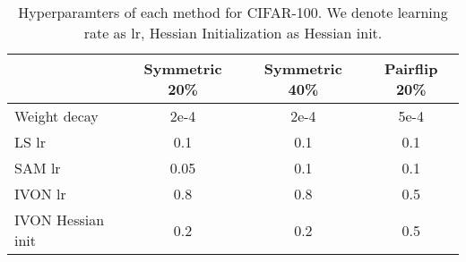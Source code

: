 \begin{table}[ht]
\centering
\caption{Hyperparamters of each method for CIFAR-100. We denote learning rate as lr, Hessian Initialization as Hessian init.}
\label{tab: cifar100 hyperparameter tuning results}
\begin{tabular}{lccc}
\toprule
                   & Symmetric 20\% & Symmetric 40\% & Pairflip 20\% \\
                   \midrule
Weight decay       & 2e-4           & 2e-4           & 5e-4          \\
LS \citep{Szegedy_rethinking} lr & 0.1               &     0.1           &    0.1           \\
SAM \citep{SAM_org} lr             &     0.05           &    0.1            &    0.1           \\
IVON \citep{IVON} lr            &      0.8          &     0.8           &      0.5         \\
IVON \citep{IVON} Hessian init  &      0.2          &     0.2           &      0.5         \\\bottomrule
\end{tabular}
\end{table}